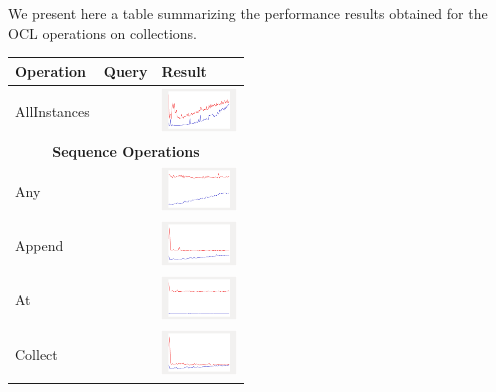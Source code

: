 We present here a table summarizing the performance results obtained for the OCL
operations on collections.


\begin{longtable}{ m{2.5cm} m{8cm} m{2cm} }
  Operation & Query & Result \\\hline
  AllInstances && 
  	\includegraphics[width=2cm]{../graphs/AllInstances}
  \\\hline
  \multicolumn{3}{c}{{\bf Sequence Operations}}\\\hline
  
  Any &
  
  & 
  	\includegraphics[width=2cm]{../graphs/sequence/small/Any}
  \\\hline
  
  Append &
  
  & 
  	\includegraphics[width=2cm]{../graphs/sequence/small/Append}
  \\\hline
  
  At &
  
  & 
  \includegraphics[width=2cm]{../graphs/sequence/small/At}
\\\hline

Collect &

&
\includegraphics[width=2cm]{../graphs/sequence/small/Collect}
\\\hline


\end{longtable}
